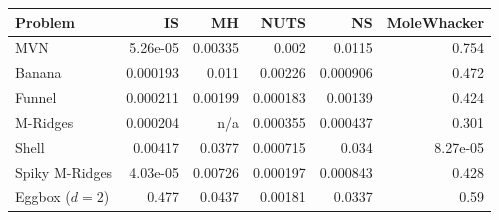 \begin{tabular}{lrrrrr}
\toprule
Problem & IS & MH & NUTS & NS & MoleWhacker \\
\midrule
MVN & 5.26e-05 & 0.00335 & 0.002 & 0.0115 & 0.754 \\
Banana & 0.000193 & 0.011 & 0.00226 & 0.000906 & 0.472 \\
Funnel & 0.000211 & 0.00199 & 0.000183 & 0.00139 & 0.424 \\
M-Ridges & 0.000204 & n/a & 0.000355 & 0.000437 & 0.301 \\
Shell & 0.00417 & 0.0377 & 0.000715 & 0.034 & 8.27e-05 \\
Spiky M-Ridges & 4.03e-05 & 0.00726 & 0.000197 & 0.000843 & 0.428 \\
\midrule
Eggbox ($d=2$) & 0.477 & 0.0437 & 0.00181 & 0.0337 & 0.59 \\
\bottomrule
\end{tabular}
